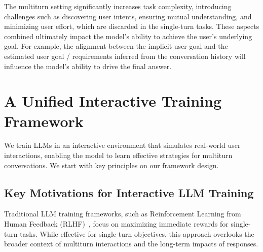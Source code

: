 The multiturn setting significantly increases task complexity, introducing challenges such as discovering user intents, ensuring mutual understanding, and minimizing user effort, which are discarded in the single-turn tasks. These aspects combined ultimately impact the model's ability to achieve the user's underlying goal. For example, the alignment between the implicit user goal and the estimated user goal / requirements inferred from the conversation history will influence the model's ability to drive the final answer.



\section{A Unified Interactive Training Framework}

We train LLMs in an interactive environment that simulates real-world user interactions, enabling the model to learn effective strategies for multiturn conversations. We start with key principles on our framework design.

\subsection{Key Motivations for Interactive LLM Training}
\label{sec:principle}

Traditional LLM training frameworks, such as Reinforcement Learning from Human Feedback (RLHF)~\citep{rlhf}, focus on maximizing immediate rewards for single-turn tasks. While effective for single-turn objectives, this approach overlooks the broader context of multiturn interactions and the long-term impacts of responses.

